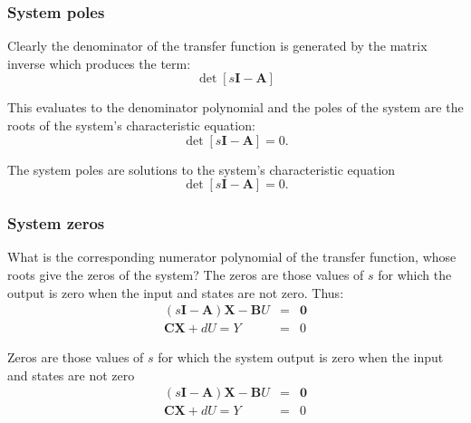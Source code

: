 \subsubsection*{System poles}

Clearly the denominator of the transfer function is generated by the matrix inverse which produces the term:
$$\det[s\mathbf{I}-\mathbf{A}]$$

This evaluates to the denominator polynomial and the poles of the system are the roots of the system's characteristic equation:
$$\det[s\mathbf{I}-\mathbf{A}] = 0.$$
\ifslidesonly
\begin{slide}
	The system poles are solutions to the system's characteristic equation
	$$\det[s\mathbf{I}-\mathbf{A}] = 0.$$
\end{slide}
\fi


\subsubsection*{System zeros}

What is the corresponding numerator polynomial of the transfer function, whose roots give the zeros of the system?
The zeros are those values of $s$ for which the output is zero when the input and states are not zero. Thus:
\begin{eqnarray*}
(s\mathbf{I}-\mathbf{A})\mathbf{X}-\mathbf{B}U & = & \mathbf{0} \\
\mathbf{CX}+dU = Y & = & 0
\end{eqnarray*}

\ifslidesonly
\begin{slide}
	Zeros are those values of $s$ for which the system output is zero when the input and states are not zero
	\begin{eqnarray*}
		(s\mathbf{I}-\mathbf{A})\mathbf{X}-\mathbf{B}U & = & \mathbf{0} \\
		\mathbf{CX}+dU = Y & = & 0
	\end{eqnarray*}
	
\end{slide}
\fi


\ifslidesonly
\begin{slide}
	
\end{slide}
\fi




\ifslidesonly
\begin{slide}
	
\end{slide}
\fi

